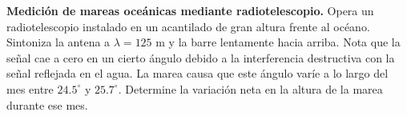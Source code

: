 \item \textbf{Medición de mareas oceánicas mediante radiotelescopio.}
Opera un radiotelescopio instalado en un acantilado de gran altura frente al océano. Sintoniza la antena a $\lambda = 125\text{ m}$ y la barre lentamente hacia arriba. Nota que la señal cae a cero en un cierto ángulo debido a la interferencia destructiva con la señal reflejada en el agua. La marea causa que este ángulo varíe a lo largo del mes entre $24.5^\circ$ y $25.7^\circ$. Determine la variación neta en la altura de la marea durante ese mes.
